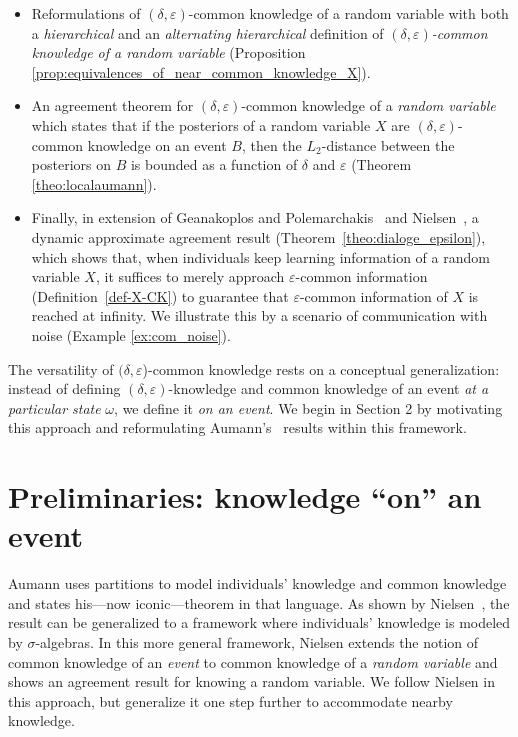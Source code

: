 \documentclass[a4paper, 10pt]{article}
\numberwithin{theorem}{section}
\theoremstyle{definition}
\renewcommand{\epsilon}{\varepsilon}
\begin{document}
\begin{itemize}
	\item [(3)] Reformulations of $(\delta, \varepsilon)$-common knowledge of a random variable with both a \emph{hierarchical} and an \emph{alternating hierarchical} definition of \emph{$(\delta, \varepsilon)$-common knowledge of a random variable} (Proposition \ref{prop:equivalences_of_near_common_knowledge_X}).
	
	\item [(4)] An agreement theorem for $(\delta, \varepsilon)$-common knowledge of a \emph{random variable} which states that if the posteriors of a random variable $X$ are $(\delta,\epsilon)$-common knowledge on an event $B$, then the $L_2$-distance between the posteriors on $B$ is bounded as a function of $\delta$ and $\epsilon$ (Theorem \ref{theo:localaumann}). 
	
	\item [(5)] Finally, in extension of 
    Geanakoplos and Polemarchakis~\cite{GePo82} and Nielsen~\cite{Ni84}, a dynamic approximate agreement result (Theorem~\ref{theo:dialoge_epsilon}), which shows that, when individuals keep learning information of a random variable $X$, it suffices to merely approach $\epsilon$-common information (Definition~\ref{def-X-CK}) to guarantee that $\epsilon$-common information of $X$ is reached at infinity. We illustrate this by a scenario of communication with noise (Example \ref{ex:com_noise}).
	
\end{itemize}


The versatility of $(\delta, \varepsilon$)-common knowledge rests on a conceptual generalization: instead of defining $(\delta, \varepsilon)$-knowledge and common knowledge of an event \emph{at a particular state} $\omega$, we define it \emph{on an event}. 
We begin in Section 2 by motivating this approach and reformulating Aumann's~\cite{Au76} results within this framework.  

\section{Preliminaries: knowledge ``on'' an event}

Aumann uses partitions to model individuals' knowledge and common knowledge and states his---now iconic---theorem in that language.  As shown by Nielsen~\cite{Ni84}, the result can be generalized to a framework where individuals' knowledge is modeled by $\sigma$-algebras. In this more general framework, Nielsen extends the notion of common knowledge of an \emph{event} to common knowledge of a \emph{random variable} and shows an agreement result for knowing a random variable. We follow Nielsen in this approach, but generalize it one step further to accommodate nearby knowledge. 
\end{document}
